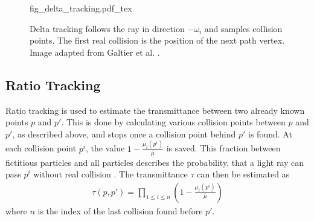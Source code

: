 \begin{figure}
\centering
\def\svgwidth{\columnwidth}
{fig_delta_tracking.pdf_tex}

\caption{Delta tracking follows the ray in direction $-\omega_i$ and samples collision points. The first real collision is the position of the next path vertex. Image adapted from Galtier et al. \cite{GALTIER201357}.}
\label{fig:delta_tracking}
\end{figure}

\begin{comment}
Delta tracking can also be used to estimate the transmittance $\tau$ between two points $p'$ and $p - \omega t$\cite{10.1145/2661229.2661292} \cite{10.1145/2661229.2661292}. This is done by using delta tracking to find a real collision on the ray from $p$ to $p'$. If this collision occurs before $p'$, $\tau$ is assumed to be 0, if the collision occurs after $p'$, $\tau$ is estimated as 1 (see figure \ref{fig:delta_tracking_distance}). However, there exist other, more sophisticated methods for estimating transmittance, such as ratio tracking.

\begin{figure}

\fontsize{7}{9}\selectfont
    \def\svgwidth{.48\columnwidth}
    {fig_delta_tracking_distance_a.pdf_tex}
    \hfill
    \def\svgwidth{.48\columnwidth}
    {fig_delta_tracking_distance_b.pdf_tex}


\caption{Estimation of transmittance by delta tracking. On the left, the first real collision takes place after $p'$. Thus, $\tau$ is estimated as 1. On the right, a real collision happens before $p'$, and $\tau$ is estimated as 0. Image inspired by Galtier et al. \cite{GALTIER201357}.} \label{fig:delta_tracking_distance}
\end{figure}
\end{comment}

\subsection{Ratio Tracking}
Ratio tracking \cite{10.1145/2661229.2661292} is used to estimate the transmittance between two already known points $p$ and $p'$. This is done by calculating various collision points between $p$ and $p'$, as described above, and stops once a collision point behind $p'$ is found. At each collision point $p^i$, the value $1 - \frac{\mu_t(p^i)}{\overline{\mu}}$ is saved. This fraction between fictitious particles and all particles describes the probability, that a light ray can pass $p^i$ without real collision \cite{10.1145/2661229.2661292}. The transmittance $\tau$ can then be estimated as 
\begin{align*}
\tau(p,p') = \prod_{1 \le i \le n}(1 - \frac{\mu_t(p^i)}{\overline{\mu}})
\end{align*}
where $n$ is the index of the last collision found before $p'$.

